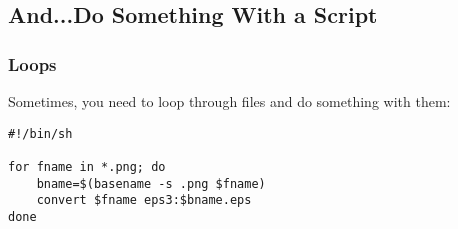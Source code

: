 \documentclass{beamer}
\begin{document}
\subsection{And...Do Something With a Script}
\begin{frame}[fragile]\frametitle{Loops}
  Sometimes, you need to loop through files and do something with them:
\begin{verbatim}
#!/bin/sh

for fname in *.png; do
    bname=$(basename -s .png $fname)
    convert $fname eps3:$bname.eps
done
\end{verbatim}
\end{frame}
\end{document}
